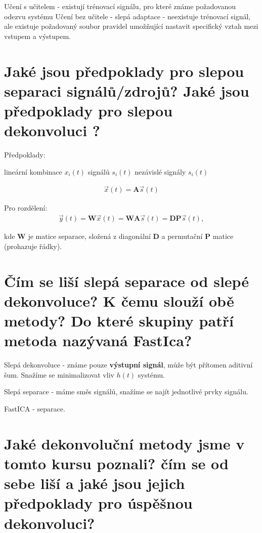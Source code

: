 \documentclass[a4paper,12pt]{article}   %
\newcommand{\mt}[1]{$#1$}
\begin{document}
\begin{outline}
        \1 Učení s učitelem - existují trénovací signálu, pro které známe požadovanou odezvu systému
        \1 Učení bez učitele - slepá adaptace - neexistuje trénovací signál, ale existuje požadovaný soubor pravidel umožňující nastavit specifický vztah mezi vstupem a výstupem. 
\end{outline}


\section{Jaké jsou předpoklady pro slepou separaci signálů/zdrojů? Jaké jsou předpoklady pro slepou dekonvoluci ?}

Předpoklady:
\begin{outline}
        \1 lineární kombinace \mt{x_i(t)} signálů \mt{s_i(t)}
        \1 nezávislé signály \mt{s_i(t)}
\end{outline}
\begin{align*}
        \vec{x}(t) = \pmb A \vec s(t)
\end{align*}

Pro rozdělení:
\begin{align*}
        \vec{y}(t) = \pmb W \vec x(t) =  \pmb W\pmb A \vec s(t) = \pmb D \pmb P \vec s(t),
\end{align*}

kde \mt{\pmb W} je matice separace, složená z diagonální \mt{\pmb D} a permutační \mt{\pmb P} matice (prohazuje řádky). 

\section{Čím se liší slepá separace od slepé dekonvoluce? K čemu slouží obě metody? Do které skupiny patří metoda nazývaná FastIca?}

Slepá dekonvoluce - známe pouze \textbf{výstupní signál}, může být přítomen aditivní šum. Snažíme se minimalizovat vliv \mt{h(t)} systému. 

Slepá separace - máme směs signálů, snažíme se najít jednotlivé prvky signálu.

FastICA - separace.


\section{Jaké dekonvoluční metody jsme v tomto kursu poznali? čím se od sebe liší a jaké jsou jejich předpoklady pro úspěšnou dekonvoluci?}
\end{document}
